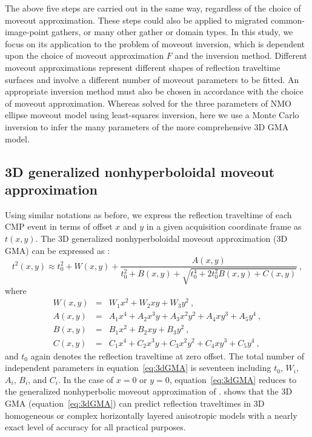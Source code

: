 The above five steps are carried out in the same way, regardless of the choice of moveout approximation. These steps could also be applied to migrated common-image-point gathers, or many other gather or domain types. In this study, we focus on its application to the problem of moveout inversion, which is dependent upon the choice of moveout approximation $F$ and the inversion method. Different moveout approximations represent different shapes of reflection traveltime surfaces and involve a different number of moveout parameters to be fitted. An appropriate inversion method must also be chosen in accordance with the choice of moveout approximation. Whereas \cite{will} solved for the three parameters of NMO ellipse moveout model using least-squares inversion, here we use a Monte Carlo inversion to infer the many parameters of the more comprehensive 3D GMA model. 


\subsection{3D generalized nonhyperboloidal moveout approximation}
Using similar notations as before, we express the reflection traveltime of each CMP event in terms of offset $x$ and $y$ in a given acquisition coordinate frame as $t(x,y)$. The 3D generalized nonhyperboloidal moveout approximation (3D GMA) can be expressed as \cite[]{zonegma}:
\begin{equation}
\label{eq:3dGMA}
t^2(x,y) \approx t^2_0 + W(x,y) + \frac{A(x,y)}{t^2_0+B(x,y)+\sqrt{t^4_0+2t^2_0B(x,y)+C(x,y)}} ~,
\end{equation} 
where
\begin{eqnarray}
\nonumber
W(x,y) & = & W_1x^2+ W_2xy+ W_3y^2~,\\
\nonumber
A(x,y) & = & A_1x^4+A_2x^3y+A_3x^2y^2+A_4xy^3+A_5y^4~,\\
\nonumber
B(x,y) & = & B_1x^2+B_2xy+B_3y^2~,\\
C(x,y) & = & C_1x^4+C_2x^3y+C_3x^2y^2+C_4xy^3+C_5y^4~,
\end{eqnarray}
and $t_0$ again denotes the reflection traveltime at zero offset. The total number of independent parameters in equation~\ref{eq:3dGMA} is seventeen including $t_0$, $W_i$, $A_i$, $B_i$, and $C_i$. In the case of $x=0$ or $y=0$, equation~\ref{eq:3dGMA} reduces to the generalized nonhyperbolic moveout approximation of \cite{fomelstovas}. \cite{zonegma} shows that the 3D GMA (equation~\ref{eq:3dGMA}) can predict reflection traveltimes in 3D homogeneous or complex horizontally layered anisotropic models with a nearly exact level of accuracy for all practical purposes.

